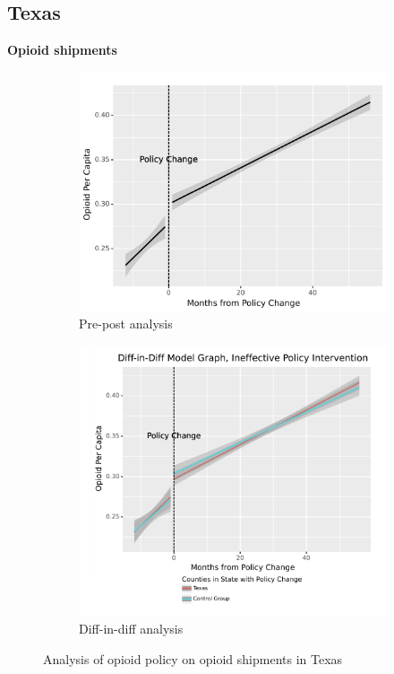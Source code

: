 \documentclass[12pt,letterpaper]{article}
\begin{document}
\subsection{Texas}
\textbf{Opioid shipments}

\begin{figure}[!h]
\centering
\begin{subfigure}{.5\textwidth}
  \centering
  \includegraphics[width=0.7\linewidth]{../30_results/Bonus_Results/tx_monthly_prepost_successful.png}
  \caption{Pre-post analysis}
  \label{fig:tx_ship_prepost}
\end{subfigure}%
\begin{subfigure}{.55\textwidth}
  \centering
  \includegraphics[width=0.7\linewidth]{../30_results/Bonus_Results/tx_monthly_did_notsure.png}
  \caption{Diff-in-diff analysis}
  \label{fig:tx_ship_did}
\end{subfigure}
\caption{Analysis of opioid policy on opioid shipments in Texas}
\label{fig:tx_ship}
\end{figure}
\end{document}
